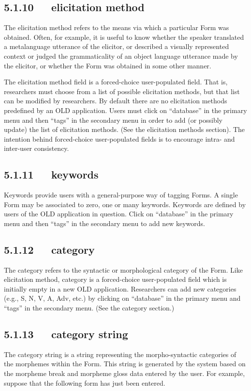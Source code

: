 \documentclass[letterpaper,10pt,english]{sphinxmanual}
\begin{document}
\subsection{5.1.10   elicitation method}
\label{documentation:elicitation-method}
The elicitation method refers to the means via which a particular Form was
obtained.  Often, for example, it is useful to know whether the speaker
translated a metalanguage utterance of the elicitor, or described a visually
represented context or judged the grammaticality of an object language utterance
made by the elicitor, or whether the Form was obtained in some other manner.

The elicitation method field is a forced-choice user-populated field.  That is,
researchers must choose from a list of possible elicitation methods, but that
list can be modified by researchers.  By default there are no elicitation
methods predefined by an OLD application.  Users must click on ``database'' in the
primary menu and then ``tags'' in the secondary menu in order to add (or possibly
update) the list of elicitation methods.  (See the elicitation methods section).
The intention behind forced-choice user-populated fields is to encourage intra-
and inter-user consistency.


\subsection{5.1.11   keywords}
\label{documentation:keywords}
Keywords provide users with a general-purpose way of tagging Forms.  A single
Form may be associated to zero, one or many keywords.  Keywords are defined by
users of the OLD application in question.  Click on ``database'' in the primary
menu and then ``tags'' in the secondary menu to add new keywords.


\subsection{5.1.12   category}
\label{documentation:category}
The category refers to the syntactic or morphological category of the Form.
Like elicitation method, category is a forced-choice user-populated field which
is initially empty in a new OLD application.  Researchers can add new categories
(e.g., S, N, V, A, Adv, etc.) by clicking on ``database'' in the primary menu and
``tags'' in the secondary menu.  (See the category section.)


\subsection{5.1.13   category string}
\label{documentation:category-string}
The category string is a string representing the morpho-syntactic categories of
the morphemes within the Form.  This string is generated by the system based on
the morpheme break and morpheme gloss data entered by the user.  For example,
suppose that the following form has just been entered.
\end{document}
